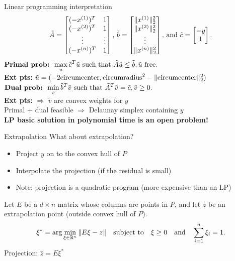 \documentclass[aspectratio=169]{beamer}
\begin{document}
\begin{frame}{Linear programming interpretation}
$$
{\tilde A} = \left[ \begin{matrix}
(-x^{(1)})^T & 1 \cr
(-x^{(2)})^T & 1 \cr
\vdots & \vdots \cr
(-x^{(n)})^T & 1 \cr
\end{matrix}\right]\text{, }
{\tilde b} = \left[ \begin{matrix}
\| x^{(1)} \|_2^2 \cr
\| x^{(2)} \|_2^2 \cr
\vdots \cr
\| x^{(n)} \|_2^2 \cr
\end{matrix}\right]\text{, and }
{\tilde c} = \left[ \begin{matrix}
-y \cr
1 \cr
\end{matrix}\right].
$$
\pause
$\displaystyle \hbox{\bf Primal prob: }
\max_{\tilde u} {\tilde c}^T {\tilde u}
\hbox{ such that }
{\tilde A}{\tilde u} \leq {\tilde b}, {\tilde u}\hbox{ free}.$\\
{\bf Ext pts:}
${\tilde u} = (-2\hbox{circumcenter}, \hbox{circumradius}^2 - \|\hbox{circumcenter}\|_2^2)$\\
\medskip
\pause
$\displaystyle \hbox{\bf Dual prob: }
\min_{\tilde v} {\tilde b}^T {\tilde v}
\hbox{ such that }
{\tilde A}^T{\tilde v} = {\tilde c}, {\tilde v}\geq 0.$\\
{\bf Ext pts:}
$\Rightarrow$ ${\tilde v}$ are convex weights for $y$\\
\medskip
\pause
Primal + dual feasible $\Rightarrow$ Delaunay simplex containing $y$\\
\medskip
\pause
{\bf LP basic solution in polynomial time is an open problem!}
\end{frame}

\begin{frame}{Extrapolation}
What about extrapolation?
\begin{itemize}
\item Project $y$ on to the convex hull of $P$
\item Interpolate the projection (if the residual is small)
\item Note: projection is a quadratic program (more expensive than an LP)
\end{itemize}
Let $E$ be a $d\times n$ matrix whose columns are points in $P$, and let
$z$ be an extrapolation point (outside convex hull of $P$).
$$
\xi^* = \arg\min_{\xi\in\mathbb{R}^n} \|E\xi - z\| \quad\hbox{subject to}\quad
\xi \ge 0 \quad\hbox{and}\quad \sum_{i=1}^n \xi_i = 1.
$$
Projection: ${\hat z} = E\xi^*$
\end{frame}
\end{document}
